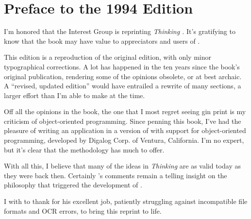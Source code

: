 \chapter*{Preface to the 1994 Edition}
\pagestyle{headings}

I'm honored that the \Forth{} Interest Group is reprinting \emph{Thinking
\Forth{}.} It's gratifying to know that the book may have value to
appreciators and users of \Forth{}.

This edition is a reproduction of the original edition, with only
minor typographical corrections. A lot has happened in the ten years
since the book's original publication, rendering some of the opinions
obsolete, or at best archaic. A ``revised, updated edition'' would
have entrailed a rewrite of many sections, a larger effort than I'm
able to make at the time.

Off all the opinions in the book, the one that I most regret seeing gin
print is my criticism of object-oriented programming. Since penning
this book, I've had the pleasure of writing an application in a
version of \Forth{} with support for object-oriented programming,
developed by Digalog Corp. of Ventura, California. I'm no expert, but
it's clear that the methodology has much to offer.

With all this, I believe that many of the ideas in \emph{Thinking
\Forth{}} are as valid today as they were back then. Certainly 's comments remain a telling insight on the philosophy that
triggered the development of \Forth{}.

I with to thank  for his excellent job, patiently
struggling against incompatible file formats and OCR errors, to bring
this reprint to life.
